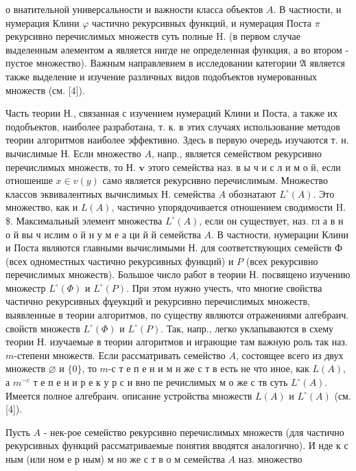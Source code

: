 \documentclass[10pt]{article}
\begin{document}
о внатительной универсальности и важности класса объектов $A$. В частности, и нумерация Клини $\varphi$ частично рекурсивных функций, и нумерация Поста $\pi$ рекурсивно перечислимых множеств суть полные $\mathrm{H}$. (в первом случае выделенным әлементом $\boldsymbol{a}$ является нигде не определенная функция, а во втором - пустое множество). Важным направлевием в исследовании категории $\mathfrak{A}$ является также выделение и изучение различных видов подобъектов нумерованных множеств (см. [4]).



Часть теории Н., связанная с изучением нумераций Клини и Поста, а также их подобъектов, наиболее разработана, т. к. в этих случаях использование методов теории алгоритмов наиболее эффективно. Здесь в первую очередь изучаются т. н. вычислимые Н. Если множество $A$, напр., является семейством рекурсивно перечислимых множеств, то Н. $\boldsymbol{v}$ этого семейства наз. в ы ч и с л и м о й, если отношенше $x \in v(y)$ само является рекурсивно перечислимым. Множество классов эквивалентных вычислимых $Н$. семейства $A$ обознатают $L^{\circ}(A)$. Это множество, как и $L(A)$, частично упорядочивается отношением сводимости H. \$. Максимальный элемент множества $L^{\circ}(A)$, если он существует, наз. гл а в н о й вы ч ислим о й н у м е а ци й й семейства $A$. В частности, нумерации Клини и Поста являются главными вычислимыми Н. для соответствующих семейств Ф (всех одноместных частично рекурсивных функций) и $P$ (всех рекурсивно перечислимых множеств). Большое число работ в теории Н. посвящено изучению множестр $L^{\circ}(\Phi)$ и $L^{\circ}(P)$. При этом нужно учесть, что многие свойства частично рекурсивных фұеукций и рекурсивно перечислимых множеств, выявленные в теории алгоритмов, по существу являются отражениями алгебраич. свойств множеств $L^{\circ}(\Phi)$ и $L^{\circ}(P)$. Так, напр., легко уклапываются в схему теории Н. изучаемые в теории алгоритмов и играющие там важную роль так наз. $m$-степени множеств. Если рассматривать семейство $A$, состоящее всего из двух множеств $\varnothing$ и $\{0\}$, то $m$-с т е п е н и м н же с т в есть не что иное, как $L(A)$, а $m^{-c}$ т е п е н и р е к у р с и вно пе речислимых м о же с тв суть $L^{\circ}(A)$. Имеется полное алгебраич. описание устройства множеств $L(A)$ и $L^{\circ}(A)$ (см. [4]).



Пусть $A$ - нек-рое семейство рекурсивно перечислимых множеств (для частично рекурсивных функций рассматриваемые понятия вводятся аналогично). И нде к с ным (или ном е р ным) м но же с т в о м семейства $A$ наз. множество
\end{document}
